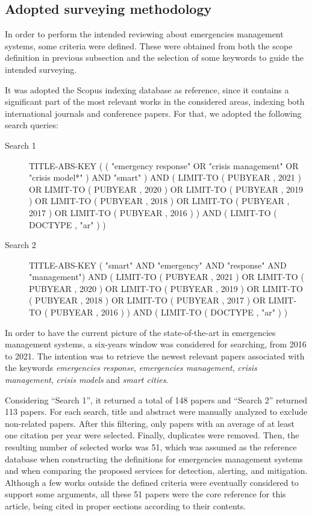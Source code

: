\begin{refsection}
\subsection{Adopted surveying methodology}

In order to perform the intended reviewing about emergencies management systems, some criteria were defined. These were obtained from both the scope definition in previous subsection and the selection of some keywords to guide the intended surveying.

It was adopted the Scopus indexing database as reference, since it contains a significant part of the most relevant works in the considered areas, indexing both international journals and conference papers. For that, we adopted the following search queries:

\begin{description}
    \item[Search 1] TITLE-ABS-KEY ( ( "emergency response"  OR  "crisis management"  OR  "crisis model*" )  AND  "smart" )  AND  ( LIMIT-TO ( PUBYEAR ,  2021 )  OR  LIMIT-TO ( PUBYEAR ,  2020 ) OR  LIMIT-TO ( PUBYEAR ,  2019 ) OR  LIMIT-TO ( PUBYEAR ,  2018 )  OR  LIMIT-TO ( PUBYEAR ,  2017 )  OR  LIMIT-TO ( PUBYEAR ,  2016 ) )  AND  ( LIMIT-TO ( DOCTYPE ,  "ar" ) )
    
    \item[Search 2] TITLE-ABS-KEY ( "smart"  AND "emergency"  AND "response"  AND "management")  AND  ( LIMIT-TO ( PUBYEAR ,  2021 )  OR  LIMIT-TO ( PUBYEAR ,  2020 ) OR  LIMIT-TO ( PUBYEAR ,  2019 ) OR  LIMIT-TO ( PUBYEAR ,  2018 )  OR  LIMIT-TO ( PUBYEAR ,  2017 )  OR  LIMIT-TO ( PUBYEAR ,  2016 ) )  AND  ( LIMIT-TO ( DOCTYPE ,  "ar" ) )
\end{description}

In order to have the current picture of the state-of-the-art in emergencies management systems, a six-years window was considered for searching, from 2016 to 2021. The intention was to retrieve the newest relevant papers associated with the keywords \textit{emergencies response}, \textit{emergencies management}, \textit{crisis management}, \textit{crisis models} and \textit{smart cities}.

Considering ``Search 1'', it returned a total of 148 papers and ``Search 2'' returned 113 papers. For each search, title and abstract were manually analyzed to exclude non-related papers. After this filtering, only papers with an average of at least one citation per year were selected. Finally, duplicates were removed. Then, the resulting number of selected works was 51, which was assumed as the reference database when constructing the definitions for emergencies management systems and when comparing the proposed services for detection, alerting, and mitigation. Although a few works outside the defined criteria were eventually considered to support some arguments, all these 51 papers were the core reference for this article, being cited in proper sections according to their contents.


\end{refsection}
